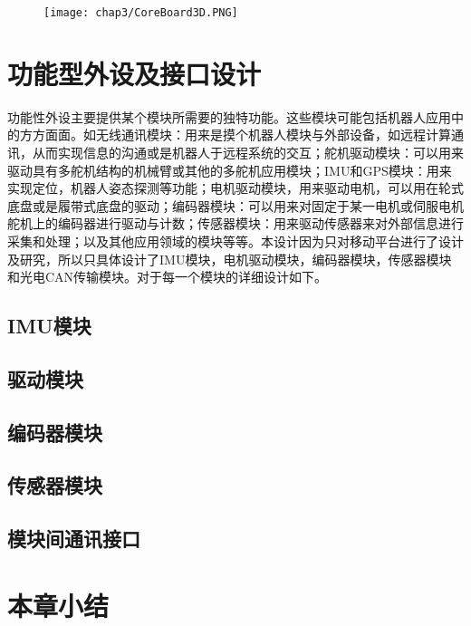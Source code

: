 \begin{figure}\label{fig.CorePCB}
  \centering
  \hspace{1in}
\end{figure}
\begin{figure}\label{fig.CoreReal}
  \centering
  \hspace{1in}
\end{figure}
\begin{figure}[!htp]\label{fig.Core3D}
  \centering
  \texttt{[image: chap3/CoreBoard3D.PNG]}
\end{figure}
\section{功能型外设及接口设计}
功能性外设主要提供某个模块所需要的独特功能。这些模块可能包括机器人应用中的方方面面。如无线通讯模块：用来是摸个机器人模块与外部设备，如远程计算通讯，从而实现信息的沟通或是机器人于远程系统的交互；舵机驱动模块：可以用来驱动具有多舵机结构的机械臂或其他的多舵机应用模块；IMU和GPS模块：用来实现定位，机器人姿态探测等功能；电机驱动模块，用来驱动电机，可以用在轮式底盘或是履带式底盘的驱动；编码器模块：可以用来对固定于某一电机或伺服电机舵机上的编码器进行驱动与计数；传感器模块：用来驱动传感器来对外部信息进行采集和处理；以及其他应用领域的模块等等。本设计因为只对移动平台进行了设计及研究，所以只具体设计了IMU模块，电机驱动模块，编码器模块，传感器模块和光电CAN传输模块。对于每一个模块的详细设计如下。\\
\subsection{IMU模块}

\subsection{驱动模块}
\subsection{编码器模块}
\subsection{传感器模块}
\subsection{模块间通讯接口}
\section{本章小结}

